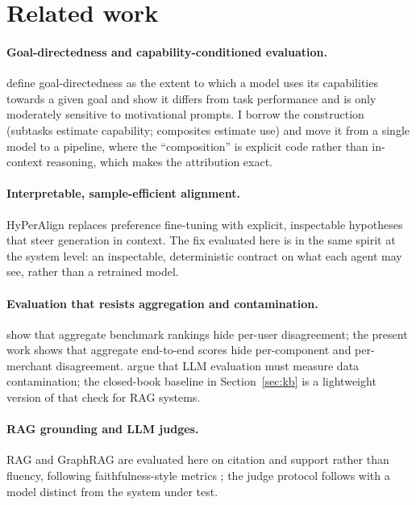 \documentclass[10pt,twocolumn]{article}
\begin{document}
\section{Related work}
\label{sec:related}

\paragraph{Goal-directedness and capability-conditioned evaluation.}
\citet{everitt2025goal} define goal-directedness as the extent to which a model uses its capabilities towards a given goal and show it differs from task performance and is only moderately sensitive to motivational prompts. I borrow the construction (subtasks estimate capability; composites estimate use) and move it from a single model to a pipeline, where the ``composition'' is explicit code rather than in-context reasoning, which makes the attribution exact.

\paragraph{Interpretable, sample-efficient alignment.}
HyPerAlign \citep{garbacea2025hyperalign} replaces preference fine-tuning with explicit, inspectable hypotheses that steer generation in context. The fix evaluated here is in the same spirit at the system level: an inspectable, deterministic contract on what each agent may see, rather than a retrained model.

\paragraph{Evaluation that resists aggregation and contamination.}
\citet{garbacea2026personalized} show that aggregate benchmark rankings hide per-user disagreement; the present work shows that aggregate end-to-end scores hide per-component and per-merchant disagreement. \citet{sainz2023contamination} argue that LLM evaluation must measure data contamination; the closed-book baseline in Section~\ref{sec:kb} is a lightweight version of that check for RAG systems.

\paragraph{RAG grounding and LLM judges.}
RAG \citep{lewis2020rag} and GraphRAG \citep{edge2024graphrag} are evaluated here on citation and support rather than fluency, following faithfulness-style metrics \citep{es2024ragas,min2023factscore}; the judge protocol follows \citet{zheng2023judge} with a model distinct from the system under test.
\end{document}
